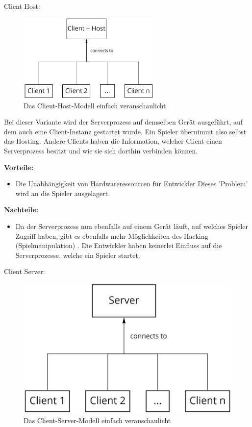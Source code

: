 \textsf{\Large Client Host:}

\begin{figure}[H]
	\centering
	\includegraphics[width=70mm]{images/Client_Host.jpg}
	\caption[Client-Server Modell]{Das Client-Host-Modell einfach veranschaulicht}
	\label{pic:Client_Host}
\end{figure}

Bei dieser Variante wird der Serverprozess auf demselben Gerät ausgeführt, auf dem auch eine Client-Instanz gestartet wurde. Ein Spieler übernimmt also selbst das Hosting. Andere Clients haben die Information, welcher Client einen Serverprozess besitzt und wie sie sich dorthin verbinden können. 

\textbf{Vorteile:}
\begin{itemize}
	\item Die Unabhängigkeit von Hardwareressourcen für Entwickler Dieses 'Problem' wird an die Spieler ausgelagert. 
\end{itemize}

\textbf{Nachteile:} 
\begin{itemize}
	\item Da der Serverprozess nun ebenfalls auf einem Gerät läuft, auf welches Spieler Zugriff haben, gibt es ebenfalls mehr Möglichkeiten des Hacking (Spielmanipulation) \cite{Wikipedia.2021h}. Die Entwickler haben keinerlei Einfluss auf die Serverprozesse, welche ein Spieler startet. \cite{Smed.2002}
\end{itemize}

\newpage
\textsf{\Large Client Server:}

\begin{figure}[H]
\centering
\includegraphics[width=150mm]{images/Client_Server.jpg}
\caption[Client-Server Modell]{Das Client-Server-Modell einfach veranschaulicht}
\label{pic:Client_Server}
\end{figure}

